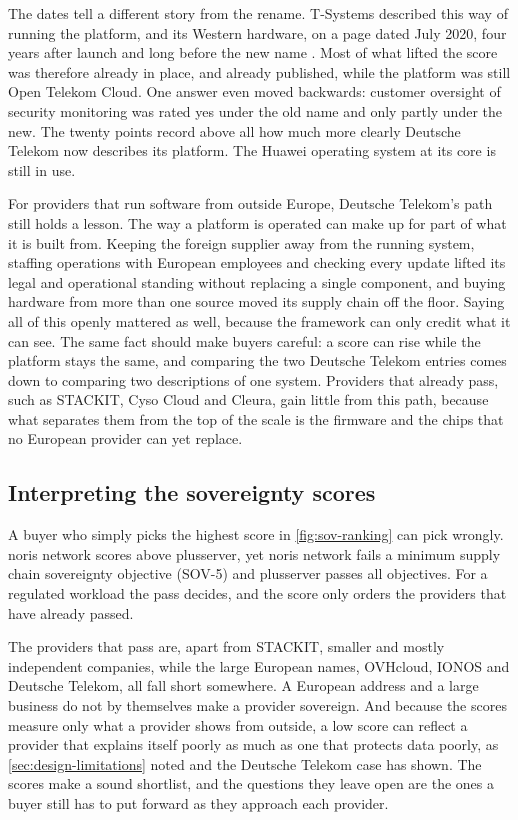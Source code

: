 The dates tell a different story from the rename. T-Systems described this way of
running the platform, and its Western hardware, on a page dated July 2020, four
years after launch and long before the new name \cite{TCloudPublic_SecureCloud}.
Most of what lifted the score was therefore already in place, and already
published, while the platform was still Open Telekom Cloud. One answer even moved
backwards: customer oversight of security monitoring was rated yes under the old
name and only partly under the new. The twenty points record above all how much
more clearly Deutsche Telekom now describes its platform. The Huawei operating
system at its core is still in use.

For providers that run software from outside Europe, Deutsche Telekom's path
still holds a lesson. The way a platform is operated can make up for part of
what it is built from. Keeping the foreign supplier away from the running
system, staffing operations with European employees and checking every update
lifted its legal and operational standing without replacing a single component,
and buying hardware from more than one source moved its supply chain off the
floor. Saying all of this openly mattered as well, because the framework can only
credit what it can see. The same fact should make buyers careful: a score can
rise while the platform stays the same, and comparing the two Deutsche Telekom
entries comes down to comparing two descriptions of one system. Providers that
already pass, such as STACKIT, Cyso Cloud and Cleura, gain little from this path,
because what separates them from the top of the scale is the firmware and the
chips that no European provider can yet replace.

\subsection{Interpreting the sovereignty scores}
\label{subsec:study1-interpretation}

A buyer who simply picks the highest score in \cref{fig:sov-ranking} can pick
wrongly. noris network scores above plusserver, yet noris network fails a
minimum supply chain sovereignty objective (SOV-5) and plusserver passes all objectives. For a regulated workload the pass decides, and the
score only orders the providers that have already passed.

The providers that pass are, apart from STACKIT, smaller and mostly independent
companies, while the large European names, OVHcloud, IONOS and Deutsche Telekom,
all fall short somewhere. A European address and a large business do not by
themselves make a provider sovereign. And because the scores measure only what a
provider shows from outside, a low score can reflect a provider that explains
itself poorly as much as one that protects data poorly, as
\cref{sec:design-limitations} noted and the Deutsche Telekom case has shown. The
scores make a sound shortlist, and the questions they leave open are the ones a
buyer still has to put forward as they approach each provider.

